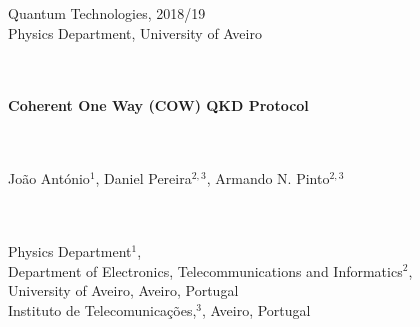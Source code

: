 \documentclass[1000pt]{article}
\begin{document}
\begin{titlepage}  

\color{itblue} \sffamily \noindent \normalsize
\hspace*{4cm} Quantum Technologies, 2018/19\\
\hspace*{4cm} Physics Department, University of Aveiro\\
\\
\\
\hspace*{6.5cm}\begin{minipage}{15in}
\vspace*{2cm}
\begin{flushleft}
 \color{title} \sffamily \noindent \Huge
\textbf{Coherent One Way (COW) QKD Protocol}
\end{flushleft}
\end{minipage}
\vspace*{2cm}\\
\\
\hspace*{6.5cm}
\color{author}
\Large João António$^1$, Daniel Pereira$^{2,3}$, Armando N. Pinto$^{2,3}$\\
\\
\vspace*{2cm}\\
\hspace*{6.5cm}
\begin{minipage}{12cm}
\color{title}
\large Physics Department$^1$,\\
Department of Electronics, Telecommunications and Informatics$^2$,\\
University of Aveiro, Aveiro, Portugal\\
Instituto de Telecomunica\c{c}\~{o}es,$^3$, Aveiro, Portugal
\end{minipage}\


\end{titlepage}
\end{document}
